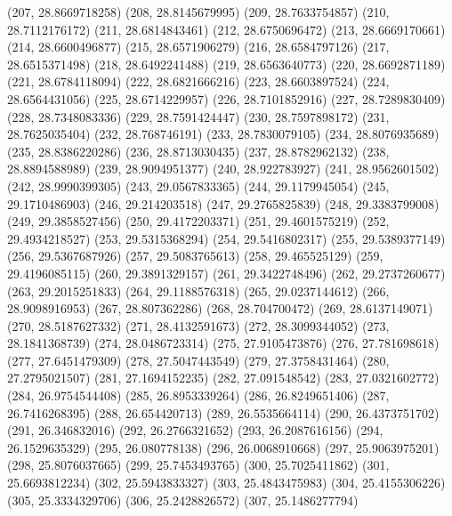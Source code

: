 {					(207, 28.8669718258)
					(208, 28.8145679995)
					(209, 28.7633754857)
					(210, 28.7112176172)
					(211, 28.6814843461)
					(212, 28.6750696472)
					(213, 28.6669170661)
					(214, 28.6600496877)
					(215, 28.6571906279)
					(216, 28.6584797126)
					(217, 28.6515371498)
					(218, 28.6492241488)
					(219, 28.6563640773)
					(220, 28.6692871189)
					(221, 28.6784118094)
					(222, 28.6821666216)
					(223, 28.6603897524)
					(224, 28.6564431056)
					(225, 28.6714229957)
					(226, 28.7101852916)
					(227, 28.7289830409)
					(228, 28.7348083336)
					(229, 28.7591424447)
					(230, 28.7597898172)
					(231, 28.7625035404)
					(232, 28.768746191)
					(233, 28.7830079105)
					(234, 28.8076935689)
					(235, 28.8386220286)
					(236, 28.8713030435)
					(237, 28.8782962132)
					(238, 28.8894588989)
					(239, 28.9094951377)
					(240, 28.922783927)
					(241, 28.9562601502)
					(242, 28.9990399305)
					(243, 29.0567833365)
					(244, 29.1179945054)
					(245, 29.1710486903)
					(246, 29.214203518)
					(247, 29.2765825839)
					(248, 29.3383799008)
					(249, 29.3858527456)
					(250, 29.4172203371)
					(251, 29.4601575219)
					(252, 29.4934218527)
					(253, 29.5315368294)
					(254, 29.5416802317)
					(255, 29.5389377149)
					(256, 29.5367687926)
					(257, 29.5083765613)
					(258, 29.465525129)
					(259, 29.4196085115)
					(260, 29.3891329157)
					(261, 29.3422748496)
					(262, 29.2737260677)
					(263, 29.2015251833)
					(264, 29.1188576318)
					(265, 29.0237144612)
					(266, 28.9098916953)
					(267, 28.807362286)
					(268, 28.704700472)
					(269, 28.6137149071)
					(270, 28.5187627332)
					(271, 28.4132591673)
					(272, 28.3099344052)
					(273, 28.1841368739)
					(274, 28.0486723314)
					(275, 27.9105473876)
					(276, 27.781698618)
					(277, 27.6451479309)
					(278, 27.5047443549)
					(279, 27.3758431464)
					(280, 27.2795021507)
					(281, 27.1694152235)
					(282, 27.091548542)
					(283, 27.0321602772)
					(284, 26.9754544408)
					(285, 26.8953339264)
					(286, 26.8249651406)
					(287, 26.7416268395)
					(288, 26.654420713)
					(289, 26.5535664114)
					(290, 26.4373751702)
					(291, 26.346832016)
					(292, 26.2766321652)
					(293, 26.2087616156)
					(294, 26.1529635329)
					(295, 26.080778138)
					(296, 26.0068910668)
					(297, 25.9063975201)
					(298, 25.8076037665)
					(299, 25.7453493765)
					(300, 25.7025411862)
					(301, 25.6693812234)
					(302, 25.5943833327)
					(303, 25.4843475983)
					(304, 25.4155306226)
					(305, 25.3334329706)
					(306, 25.2428826572)
					(307, 25.1486277794)
}
